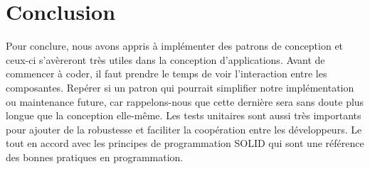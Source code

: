 \documentclass[a11paper, 11pt]{article}
\begin{document}
\newpage
\section{Conclusion}
Pour conclure, nous avons appris à implémenter des patrons de conception et ceux-ci s'avèreront très utiles dans la conception d'applications. Avant de commencer à coder, il faut prendre le temps de voir l'interaction entre les composantes. Repérer si un patron qui pourrait simplifier notre implémentation ou maintenance future, car rappelons-nous que cette dernière sera sans doute plus longue que la conception elle-même. Les tests unitaires sont aussi très importants pour ajouter de la robustesse et faciliter la coopération entre les développeurs. Le tout en accord avec les principes de programmation SOLID qui sont une référence des bonnes pratiques en programmation.\\
\end{document}
